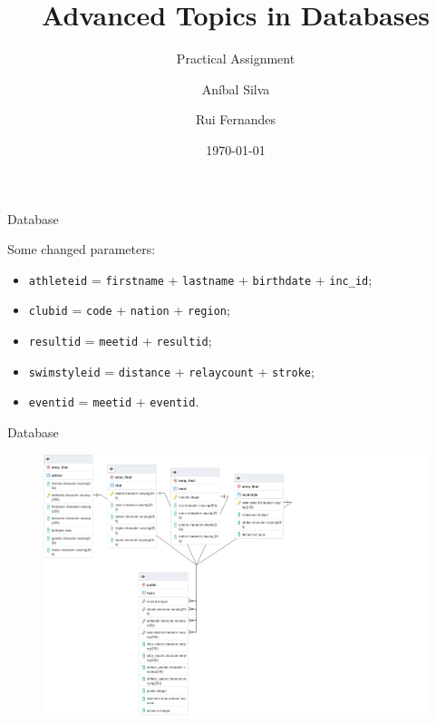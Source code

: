 \documentclass[aspectratio=169, xcolor=dvipsnames]{beamer}
\title{Advanced Topics in Databases}
\subtitle{Practical Assignment}
\author{Aníbal Silva \and Rui Fernandes}
\date{\today}
\begin{document}
\renewcommand{\today}{\ifcase \month\or January\or February\or March\or %
April\or May\or June\or July\or August\or September\or October\or November\or %
December\fi, \number \year}

\begin{frame}
    \titlepage
\end{frame}

\begin{frame}{Database}

\begin{block}{Some changed parameters:}

\begin{itemize}
    \item \texttt{athleteid} = \texttt{firstname} + \texttt{lastname} + \texttt{birthdate} + \texttt{inc\_id};
    \item \texttt{clubid} = \texttt{code} + \texttt{nation} + \texttt{region};
    \item \texttt{resultid} = \texttt{meetid} + \texttt{resultid};
    \item \texttt{swimstyleid} = \texttt{distance} + \texttt{relaycount} + \texttt{stroke};
    \item \texttt{eventid} = \texttt{meetid} + \texttt{eventid}.
\end{itemize}
    
\end{block}

\end{frame}

\begin{frame}{Database}
    \begin{figure}[H]
        \centering
        \includegraphics[width=.7\textwidth]{img/er.png}
    \end{figure}
\end{frame}
\end{document}
